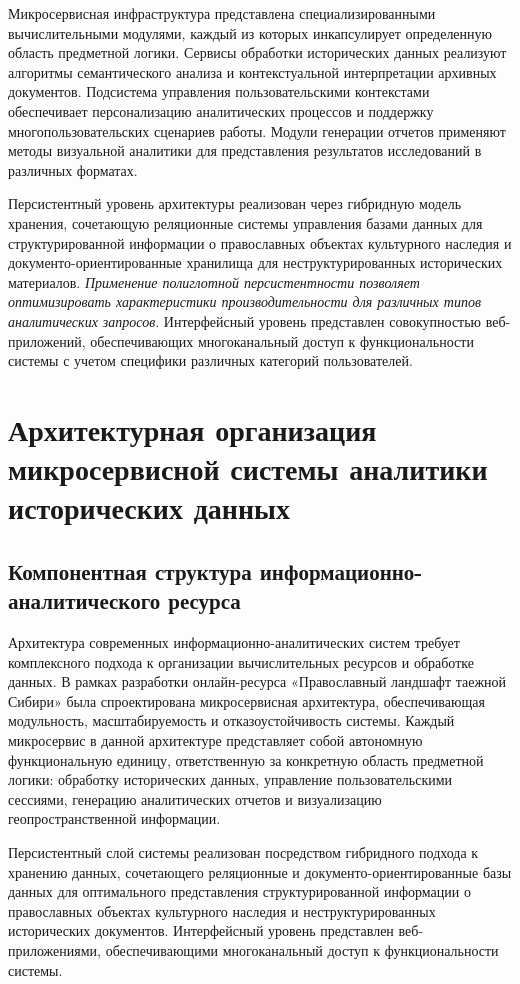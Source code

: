 Микросервисная инфраструктура представлена специализированными вычислительными модулями, каждый из которых инкапсулирует определенную область предметной логики. Сервисы обработки исторических данных реализуют алгоритмы семантического анализа и контекстуальной интерпретации архивных документов. Подсистема управления пользовательскими контекстами обеспечивает персонализацию аналитических процессов и поддержку многопользовательских сценариев работы. Модули генерации отчетов применяют методы визуальной аналитики для представления результатов исследований в различных форматах.

Персистентный уровень архитектуры реализован через гибридную модель хранения, сочетающую реляционные системы управления базами данных для структурированной информации о православных объектах культурного наследия и документо-ориентированные хранилища для неструктурированных исторических материалов. \textit{Применение полиглотной персистентности позволяет оптимизировать характеристики производительности для различных типов аналитических запросов}. Интерфейсный уровень представлен совокупностью веб-приложений, обеспечивающих многоканальный доступ к функциональности системы с учетом специфики различных категорий пользователей.


\section{Архитектурная организация микросервисной системы аналитики исторических данных}

\subsection{Компонентная структура информационно-аналитического ресурса}

Архитектура современных информационно-аналитических систем требует комплексного подхода к организации вычислительных ресурсов и обработке данных. В рамках разработки онлайн-ресурса «Православный ландшафт таежной Сибири» была спроектирована микросервисная архитектура, обеспечивающая модульность, масштабируемость и отказоустойчивость системы. Каждый микросервис в данной архитектуре представляет собой автономную функциональную единицу, ответственную за конкретную область предметной логики: обработку исторических данных, управление пользовательскими сессиями, генерацию аналитических отчетов и визуализацию геопространственной информации.

Персистентный слой системы реализован посредством гибридного подхода к хранению данных, сочетающего реляционные и документо-ориентированные базы данных для оптимального представления структурированной информации о православных объектах культурного наследия и неструктурированных исторических документов. Интерфейсный уровень представлен веб-приложениями, обеспечивающими многоканальный доступ к функциональности системы.

